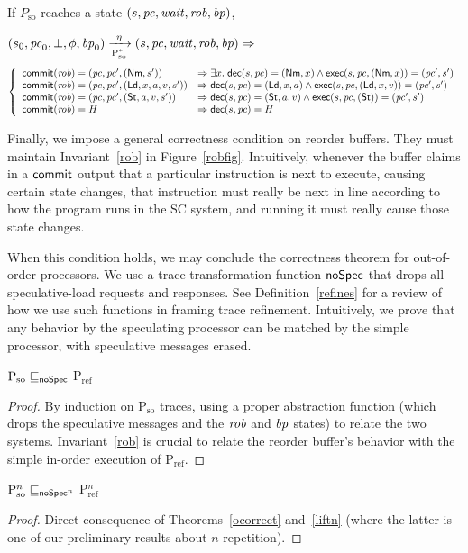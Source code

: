 \begin{figure*}[t]
\begin{inv}
If $P_\text{so}$ reaches a state $(s, \pc, \wait, \rob, \ppc)$, \ie{}

$\io{P$_\text{so}^{*}$}{s_0,\pc_0,\bot,\phi,\ppc_0}{s,\pc,\wait,\rob,\ppc}{\eta} \Rightarrow$
\begin{displaymath}
\left\{
\begin{array}{ll}
\commit(\rob) = (\pc, \pc', (\nm, s')) &\Rightarrow
\exists x. \; \dec(s,\pc) = (\nm, x) \wedge \exec(s,\pc, (\nm,x)) =
(\pc', s')\\
\commit(\rob) = (\pc, \pc', (\ld, x, a, v, s')) & \Rightarrow
\dec(s,\pc) = (\ld, x,a) \wedge \exec(s,\pc, (\ld,x,v)) = (\pc', s')\\
\commit(\rob) = (\pc, \pc', (\st, a, v, s')) &\Rightarrow
\dec(s,\pc) = (\st, a,v) \wedge \exec(s,\pc, (\st)) =
(\pc', s')\\
\commit(\rob) = H & \Rightarrow
\dec(s, \pc) = H\\
\end{array}
\right.\end{displaymath}
\label{rob}
\end{inv}
\vspace{-.5cm}
\caption{Correctness of reorder buffer}
\label{robfig}
\end{figure*}

Finally, we impose a general correctness condition on reorder
buffers.  They must maintain Invariant~\ref{rob} in Figure~\ref{robfig}.
Intuitively, whenever the buffer claims in a $\commit$
output that a particular instruction is next to execute, causing
certain state changes, that instruction must really be next in line according
to how the program runs in the SC system, and running it must really cause
those state changes.

When this condition holds, we may conclude the correctness theorem for
out-of-order processors.  We use a trace-transformation function
$\noSpec$ that drops all speculative-load requests and responses.
See Definition~\ref{refines} for a review of how we use such
functions in framing trace refinement.  Intuitively, we prove that any
behavior by the speculating processor can be matched by the simple
processor, with speculative messages erased.

\begin{theorem}
\label{ocorrect}
$\text{P$_\text{so}$} \sqsubseteq_\noSpec$ P$_\text{ref}$
\end{theorem}
\begin{proof}
By induction on P$_\text{so}$ traces, using a proper abstraction
function (which drops the speculative messages and the $\rob$ and $\ppc$ states) to relate the two systems.  Invariant~\ref{rob} is crucial to
relate the reorder buffer's behavior with the simple in-order
execution of P$_\text{ref}$.
\end{proof}

\begin{corollary}
\label{ges}
$\text{P$^n_\text{so}$} \sqsubseteq_{\noSpec^n}$ P$_\text{ref}^n$
\end{corollary}
\begin{proof}
Direct consequence of Theorems~\ref{ocorrect} and~\ref{liftn} (where the
latter is one of our preliminary results about $n$-repetition).
\end{proof}

